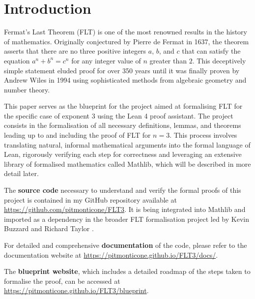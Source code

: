 

\author{Pietro Monticone}

\chapter*{Introduction}

Fermat's Last Theorem (FLT) is one of the most renowned results in the history of mathematics.
Originally conjectured by Pierre de Fermat in 1637, the theorem asserts that there are no three
positive integers $a$, $b$, and $c$ that can satisfy the equation $a^n + b^n = c^n$ for any
integer value of $n$ greater than $2$. This deceptively simple statement eluded proof for over
350 years until it was finally proven by Andrew Wiles in 1994 using sophisticated methods from
algebraic geometry and number theory.

This paper serves as the blueprint for the project aimed at formalising FLT for the specific case of
exponent $3$ using the Lean 4 proof assistant.
The project consists in the formalisation of all necessary definitions, lemmas, and theorems leading up to
and including the proof of FLT for $n = 3$. This process involves translating natural, informal mathematical arguments
into the formal language of Lean, rigorously verifying each step for correctness and leveraging
an extensive library of formalised mathematics called Mathlib,
which will be described in more detail later.

The \textbf{source code} necessary to understand and verify the formal proofs of this project is contained
in my GitHub repository available at \url{https://github.com/pitmonticone/FLT3}. It is being integrated into
Mathlib and imported as a dependency in the broader FLT formalisation project led by Kevin Buzzard and Richard Taylor \cite{FLT}.

For detailed and comprehensive \textbf{documentation} of the code, please refer to the documentation website at \url{https://pitmonticone.github.io/FLT3/docs/}.

The \textbf{blueprint website}, which includes a detailed roadmap of the steps taken to formalise the proof,
can be accessed at \url{https://pitmonticone.github.io/FLT3/blueprint}.

